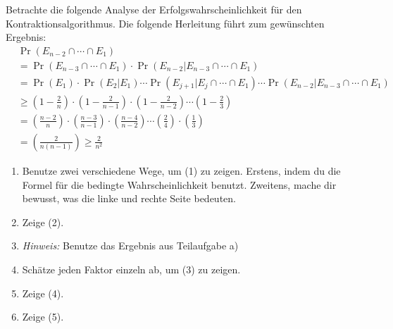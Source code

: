 \documentclass{uebung_cs}
\begin{document}
\begin{aufgabe}
	Betrachte die folgende Analyse der Erfolgswahrscheinlichkeit für den Kontraktionsalgorithmus. Die folgende Herleitung führt zum gewünschten Ergebnis:
	\begin{align}
		&\nonumber\Pr(E_{n-2} \cap \cdots \cap E_1) \\
		&= \Pr(E_{n-3} \cap \cdots \cap E_1) \cdot \Pr(E_{n-2}|E_{n-3} \cap \cdots \cap E_1) \\
		&= \Pr(E_1) \cdot \Pr(E_2|E_1) \cdots \Pr(E_{j+1} | E_j \cap \cdots \cap E_1) \cdots \Pr(E_{n-2} | E_{n-3} \cap \cdots \cap E_1) \\
		&\ge \left(1 - \frac{2}{n} \right) \cdot \left(1 - \frac{2}{n-1} \right) \cdot \left(1 - \frac{2}{n-2} \right) \cdots \left(1 - \frac{2}{3} \right) \\
		&= \left(\frac{n-2}{n}\right) \cdot \left(\frac{n-3}{n-1}\right) \cdot \left(\frac{n-4}{n-2}\right) \cdots \left(\frac{2}{4}\right) \cdot \left(\frac{1}{3}\right) \\
		&= \left(\frac{2}{n(n-1)}\right) \geq \frac{2}{n^2}
	\end{align}
	\begin{enumerate}
		\item Benutze zwei verschiedene Wege, um (1) zu zeigen. Erstens, indem du die Formel für die bedingte Wahrscheinlichkeit benutzt. Zweitens, mache dir bewusst, was die linke und rechte Seite bedeuten.
		\item Zeige (2). 
		\item[] \textit{Hinweis:} Benutze das Ergebnis aus Teilaufgabe a)
		\item Schätze jeden Faktor einzeln ab, um (3) zu zeigen. 
		\item Zeige (4).
		\item Zeige (5).
	\end{enumerate}
\end{aufgabe}
\end{document}

